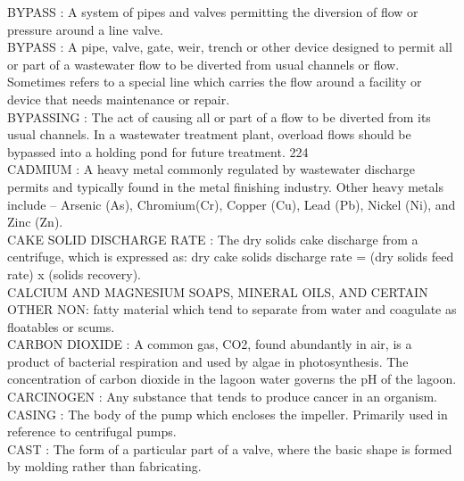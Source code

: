 \vspace{0.15cm}
BYPASS :   A system of pipes and valves permitting the diversion of flow or pressure around a line valve.\\
\vspace{0.15cm}
BYPASS :  A pipe, valve, gate, weir, trench or other device designed to permit all or part of a wastewater flow to be diverted from usual channels or flow. Sometimes refers to a special line which carries the flow around a facility or device that needs maintenance or repair. \\
\vspace{0.15cm}
BYPASSING :  The act of causing all or part of a flow to be diverted from its usual channels. In a wastewater treatment plant, overload flows should be bypassed into a holding pond for future treatment. 224 \\
\vspace{0.15cm}
CADMIUM :   A heavy metal commonly regulated by wastewater discharge permits and typically found in the metal finishing industry.  Other heavy metals include – Arsenic (As), Chromium(Cr), Copper (Cu), Lead (Pb), Nickel (Ni), and Zinc (Zn).\\
\vspace{0.15cm}
CAKE SOLID DISCHARGE RATE :  The dry solids cake discharge from a centrifuge, which is expressed as: dry cake solids discharge rate = (dry solids feed rate) x (solids recovery). \\
\vspace{0.15cm}
CALCIUM AND MAGNESIUM SOAPS, MINERAL OILS, AND CERTAIN OTHER NON: fatty material which tend to separate from water and coagulate as floatables or scums. \\
\vspace{0.15cm}
CARBON DIOXIDE :  A common gas, CO2, found abundantly in air, is a product of bacterial respiration and used by algae in photosynthesis. The concentration of carbon dioxide in the lagoon water governs the pH of the lagoon.\\
\vspace{0.15cm}
CARCINOGEN :  Any substance that tends to produce cancer in an organism.\\
\vspace{0.15cm}
CASING :   The body of the pump which encloses the impeller. Primarily used in reference to centrifugal pumps.\\
\vspace{0.15cm}
CAST :   The form of a particular part of a valve, where the basic shape is formed by molding rather than fabricating.\\
